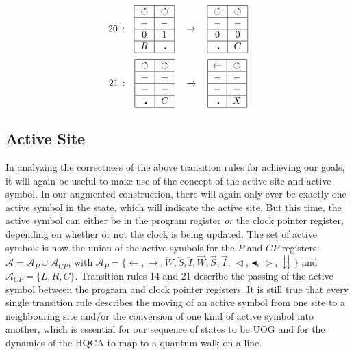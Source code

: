 \documentclass[11pt,letterpaper]{article}
\newcommand{\<}{\langle}
\renewcommand{\>}{\rangle}
\newcommand{\tur}{\,\circlearrowleft\,}   %
\newcommand{\gat}{\,\blacktriangleleft}  %
\newcommand{\mov}{\,\vartriangleleft}    %
\newcommand{\rmov}{\,\vartriangleright}
\newcommand{\bul}{\:\:\centerdot\:}       %
\newcommand{\li}{\overleftarrow{I}}
\newcommand{\ri}{\overrightarrow{I}}
\newcommand{\lw}{\overleftarrow{W}}
\newcommand{\rw}{\overrightarrow{W}}
\newcommand{\ls}{\overleftarrow{S}}
\newcommand{\rs}{\overrightarrow{S}}
\newcommand{\goes}{\:\rightarrow\:}		%
\newcommand{\eight}[8]{ 		%
	\begin{array}{|c|c|}
	\hline #1 & #2 \\
	\hline #3 & #4 \\
	\hline #5 & #6 \\
	\hline #7 & #8 \\
	\hline
	\end{array}}
\begin{document}
\begin{eqnarray}
	\begin{array}{rccccrccc}
	20\,:& 
		\eight{\tur}{\tur}{-}{-}{0}{1}{R}{\bul}
		&\goes&
		\eight{\tur}{\tur}{-}{-}{0}{0}{\bul}{C}
	\end{array}	\label{rule20}
\end{eqnarray}
\begin{eqnarray}
	\begin{array}{rccccrccc}
	21\,:& 
		\eight{\tur}{\tur}{-}{-}{-}{-}{\bul}{C}
		&\goes&
		\eight{\leftarrow}{\tur}{-}{-}{-}{-}{\bul}{X}
	\end{array}	\label{rule21}
\end{eqnarray}
\subsection{Active Site}
In analyzing the correctness of the above transition rules for achieving our goals, it will again be useful to make use of the concept of the active site and active symbol. In our augmented construction, there will again only ever be exactly one active symbol in the state, which will indicate the active site. But this time, the active symbol can either be in the program register \emph{or} the clock pointer register, depending on whether or not the clock is being updated. The set of active symbols is now the union of the active symbols for the $P$ and $CP$ registers: $\mathcal{A}=\mathcal{A}_P\cup\mathcal{A}_{CP}$, with $\mathcal{A}_P=\{\leftarrow,\rightarrow,\lw,\ls,\li,\rw,\rs,\ri,\mov,\gat,\rmov,\downdownarrows\}$ and $\mathcal{A}_{CP}=\{L,R,C\}$. Transition rules 14 and 21 describe the passing of the active symbol between the program and clock pointer registers. It is still true that every single transition rule describes the moving of an active symbol from one site to a neighbouring site and/or the conversion of one kind of active symbol into another, which is essential for our sequence of states to be UOG and for the dynamics of the HQCA to map to a quantum walk on a line.
\end{document}
